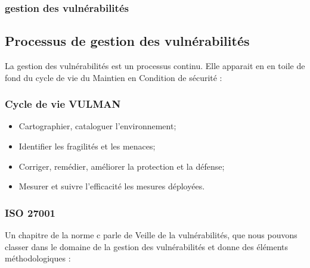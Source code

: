 \begin{frame}
\frametitle<presentation>{gestion des vulnérabilités}
\end{frame}


\subsection{Processus de gestion des vulnérabilités}

La gestion des vulnérabilités est un processus continu. Elle apparait en en toile de fond du cycle de vie du Maintien en Condition de sécurité :

\begin{frame}
\frametitle<presentation>{Cycle de vie VULMAN}
\begin{itemize}
	\item Cartographier, cataloguer l'environnement; 
	\item Identifier les fragilités et les menaces;
	\item Corriger, remédier, améliorer la protection et la défense;
	\item Mesurer et suivre l'efficacité les mesures déployées.
\end{itemize}
\end{frame}


\subsubsection{ISO 27001}

Un chapitre de la norme c parle de Veille de la vulnérabilités, que nous pouvons classer dans le domaine de la gestion des vulnérabilités et donne des éléments méthodologiques : 

